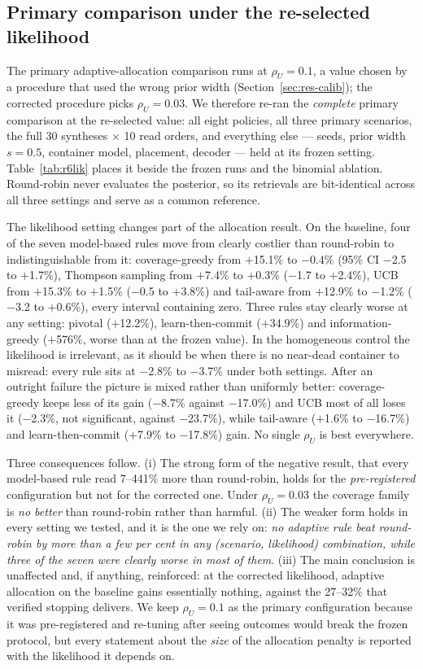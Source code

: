 \documentclass[conference,onecolumn,11pt]{IEEEtran}
\begin{document}
\subsection{Primary comparison under the re-selected likelihood}\label{sec:res-lik}

The primary adaptive-allocation comparison runs at $\rho_U{=}0.1$, a value chosen by a procedure that
used the wrong prior width (Section~\ref{sec:res-calib}); the corrected procedure picks
$\rho_U{=}0.03$.  We therefore re-ran the \emph{complete} primary comparison at the re-selected value:
all eight policies, all three primary scenarios, the full 30 syntheses $\times$ 10 read orders, and
everything else --- seeds, prior width $s{=}0.5$, container model, placement, decoder --- held at its
frozen setting.  Table~\ref{tab:r6lik} places it beside the frozen runs and the binomial ablation.
Round-robin never evaluates the posterior, so its retrievals are bit-identical across all three
settings and serve as a common reference.

The likelihood setting changes part of the allocation result.  On the baseline, four of the seven model-based rules move from clearly costlier than
round-robin to indistinguishable from it: coverage-greedy from $+$15.1\% to $-$0.4\% (95\% CI $-$2.5 to
$+$1.7\%), Thompson sampling from $+$7.4\% to $+$0.3\% ($-$1.7 to $+$2.4\%), UCB from $+$15.3\% to
$+$1.5\% ($-$0.5 to $+$3.8\%) and tail-aware from $+$12.9\% to $-$1.2\% ($-$3.2 to $+$0.6\%), every
interval containing zero.  Three rules stay clearly worse at any setting: pivotal ($+$12.2\%),
learn-then-commit ($+$34.9\%) and information-greedy ($+$576\%, worse than at the frozen value).  In the
homogeneous control the likelihood is irrelevant, as it should be when there is no near-dead container
to misread: every rule sits at $-$2.8\% to $-$3.7\% under both settings.  After an outright failure the
picture is mixed rather than uniformly better: coverage-greedy keeps less of its gain ($-$8.7\% against
$-$17.0\%) and UCB most of all loses it ($-$2.3\%, not significant, against $-$23.7\%), while tail-aware
($+$1.6\% to $-$16.7\%) and learn-then-commit ($+$7.9\% to $-$17.8\%) gain.  No single $\rho_U$ is best
everywhere.

Three consequences follow.  (i) The strong form of the negative result, that every model-based rule
read 7--441\% more than round-robin, holds for the \emph{pre-registered} configuration but not for the
corrected one.  Under $\rho_U{=}0.03$ the coverage family is \emph{no better} than round-robin rather
than harmful.  (ii) The weaker form holds in every setting we tested, and it is the one we rely on:
\emph{no adaptive rule beat round-robin by more than a few per cent in any (scenario, likelihood)
combination, while three of the seven were clearly worse in most of them}.  (iii) The main conclusion
is unaffected and, if anything, reinforced: at the corrected likelihood, adaptive allocation on the
baseline gains essentially nothing, against the 27--32\% that verified stopping delivers.  We keep
$\rho_U{=}0.1$ as the primary configuration because it was pre-registered and re-tuning after seeing
outcomes would break the frozen protocol, but every statement about the \emph{size} of the allocation
penalty is reported with the likelihood it depends on.
\end{document}
